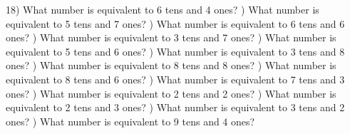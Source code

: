 \documentclass{article}%
\begin{document}
18) What number is equivalent to 6 tens and 4 ones?%
\newline%
\newline%
) What number is equivalent to 5 tens and 7 ones?%
\newline%
\newline%
) What number is equivalent to 6 tens and 6 ones?%
\newline%
\newline%
) What number is equivalent to 3 tens and 7 ones?%
\newline%
\newline%
) What number is equivalent to 5 tens and 6 ones?%
\newline%
\newline%
) What number is equivalent to 3 tens and 8 ones?%
\newline%
\newline%
) What number is equivalent to 8 tens and 8 ones?%
\newline%
\newline%
) What number is equivalent to 8 tens and 6 ones?%
\newline%
\newline%
) What number is equivalent to 7 tens and 3 ones?%
\newline%
\newline%
) What number is equivalent to 2 tens and 2 ones?%
\newline%
\newline%
) What number is equivalent to 2 tens and 3 ones?%
\newline%
\newline%
) What number is equivalent to 3 tens and 2 ones?%
\newline%
\newline%
) What number is equivalent to 9 tens and 4 ones?%
\newline%
\newline%
\newline%
\end{document}
